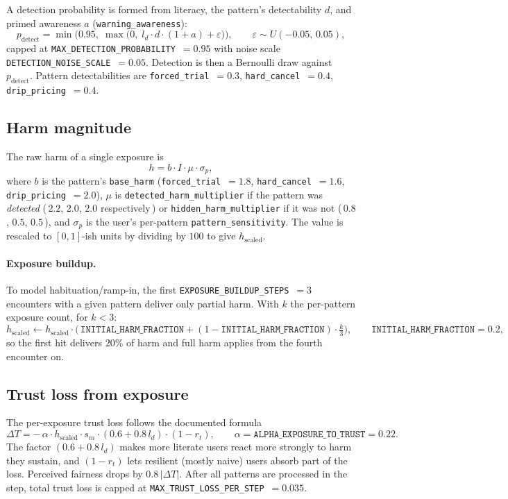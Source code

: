 \documentclass[11pt]{article}
\newcommand{\code}[1]{\texttt{#1}}
\begin{document}
A detection probability is formed from literacy, the pattern's detectability $d$,
and primed awareness $a$ (\code{warning\_awareness}):
\[
p_{\text{detect}} = \min\!\Big(0.95,\;
\max\!\big(0,\; l_d \cdot d \cdot (1 + a) + \varepsilon\big)\Big),
\qquad \varepsilon \sim U(-0.05,\,0.05),
\]
capped at \code{MAX\_DETECTION\_PROBABILITY}~$=0.95$ with noise scale
\code{DETECTION\_NOISE\_SCALE}~$=0.05$. Detection is then a Bernoulli draw against
$p_{\text{detect}}$. Pattern detectabilities are
\code{forced\_trial}~$=0.3$, \code{hard\_cancel}~$=0.4$,
\code{drip\_pricing}~$=0.4$.

\subsection{Harm magnitude}
\label{sub:harm}

The raw harm of a single exposure is
\[
h = b \cdot I \cdot \mu \cdot \sigma_p,
\]
where $b$ is the pattern's \code{base\_harm}
(\code{forced\_trial}~$=1.8$, \code{hard\_cancel}~$=1.6$,
\code{drip\_pricing}~$=2.0$), $\mu$ is \code{detected\_harm\_multiplier} if the
pattern was \emph{detected} (\,$2.2$, $2.0$, $2.0$ respectively\,) or
\code{hidden\_harm\_multiplier} if it was not (\,$0.8$, $0.5$, $0.5$\,), and
$\sigma_p$ is the user's per-pattern \code{pattern\_sensitivity}. The value is
rescaled to $[0,1]$-ish units by dividing by $100$ to give $h_{\text{scaled}}$.

\paragraph{Exposure buildup.}
To model habituation/ramp-in, the first
\code{EXPOSURE\_BUILDUP\_STEPS}~$=3$ encounters with a given pattern deliver only
partial harm. With $k$ the per-pattern exposure count, for $k <3$:
\[
h_{\text{scaled}} \leftarrow h_{\text{scaled}} \cdot
\Big(\,\code{INITIAL\_HARM\_FRACTION} +
(1-\code{INITIAL\_HARM\_FRACTION})\cdot \tfrac{k}{3}\Big),
\qquad \code{INITIAL\_HARM\_FRACTION}=0.2,
\]
so the first hit delivers $20\%$ of harm and full harm applies from the fourth
encounter on.

\subsection{Trust loss from exposure}
\label{sub:trustloss}

The per-exposure trust loss follows the documented formula
\[
\Delta T = -\,\alpha \cdot h_{\text{scaled}} \cdot s_m \cdot (0.6 + 0.8\,l_d)
\cdot (1 - r_t),
\qquad \alpha = \code{ALPHA\_EXPOSURE\_TO\_TRUST} = 0.22 .
\]
The factor $(0.6 + 0.8\,l_d)$ makes more literate users react more strongly to
harm they sustain, and $(1 - r_t)$ lets resilient (mostly naive) users absorb
part of the loss. Perceived fairness drops by $0.8\,|\Delta T|$. After all
patterns are processed in the step, total trust loss is capped at
\code{MAX\_TRUST\_LOSS\_PER\_STEP}~$=0.035$.
\end{document}
